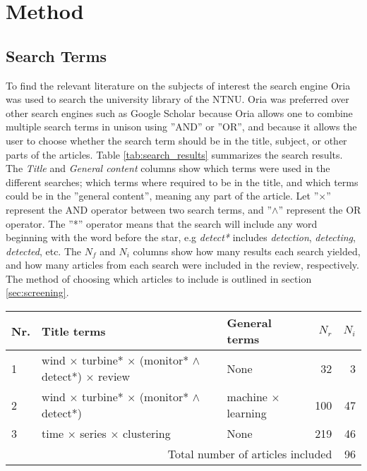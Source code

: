 \newpage
\chapter{Method}

\section{Search Terms}
To find the relevant literature on the subjects of interest the search engine Oria was used to search the university library of the NTNU. 
Oria was preferred over other search engines such as Google Scholar because Oria allows one to combine multiple search terms in unison using ''AND'' or ''OR'', and because it allows the user to choose whether the search term should be in the title, subject, or other parts of the articles. 
Table \ref{tab:search_results} summarizes the search results. 
The \textit{Title} and \textit{General content} columns show which terms were used in the different searches; which terms where required to be in the title, and which terms could be in the ''general content'', meaning any part of the article. 
Let ''$\times$'' represent the AND operator between two search terms, and ''$\wedge$'' represent the OR operator. 
The ''*'' operator means that the search will include any word beginning with the word before the star, e.g \textit{detect*} includes \textit{detection}, \textit{detecting}, \textit{detected}, etc. 
The $N_f$ and $N_i$ columns show how many results each search yielded, and how many articles from each search were included in the review, respectively. 
The method of choosing which articles to include is outlined in section \ref{sec:screening}. \bigskip 

\begin{table*}[h]
    \centering
    \begin{tabular}{ lllrr } 
        \toprule
        Nr. & Title terms & General terms & $N_r$ & $N_i$ \\
        \midrule
        1 & wind $\times$ turbine* $\times$ (monitor* $\wedge{}$ detect*) $\times$ review & None & 32 & 3 \\
        2 & wind $\times$ turbine* $\times$ (monitor* $\wedge{}$ detect*) & machine $\times$ learning & 100 & 47 \\ 
        3 & time $\times$ series $\times$ clustering & None & 219 & 46 \\ 
        \midrule
        \multicolumn{4}{r}{Total number of articles included} & 96 \\
        \bottomrule
    \end{tabular}
    \caption{Search results}
    \label{tab:search_results}
\end{table*}

